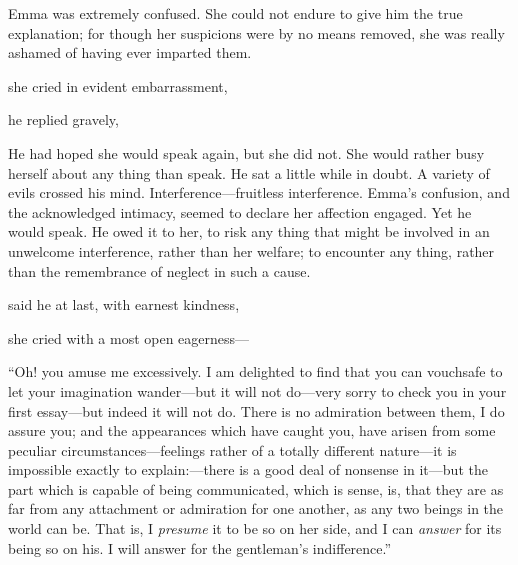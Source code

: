 Emma was extremely confused. She could not endure to give him the true explanation; for though her suspicions were by no means removed, she was really ashamed of having ever imparted them.

 she cried in evident embarrassment, 

 he replied gravely, 

He had hoped she would speak again, but she did not. She would rather busy herself about any thing than speak. He sat a little while in doubt. A variety of evils crossed his mind. Interference---fruitless interference. Emma's confusion, and the acknowledged intimacy, seemed to declare her affection engaged. Yet he would speak. He owed it to her, to risk any thing that might be involved in an unwelcome interference, rather than her welfare; to encounter any thing, rather than the remembrance of neglect in such a cause.

 said he at last, with earnest kindness, 



 she cried with a most open eagerness---


“Oh! you amuse me excessively. I am delighted to find that you can vouchsafe to let your imagination wander---but it will not do---very sorry to check you in your first essay---but indeed it will not do. There is no admiration between them, I do assure you; and the appearances which have caught you, have arisen from some peculiar circumstances---feelings rather of a totally different nature---it is impossible exactly to explain:---there is a good deal of nonsense in it---but the part which is capable of being communicated, which is sense, is, that they are as far from any attachment or admiration for one another, as any two beings in the world can be. That is, I {\em presume} it to be so on her side, and I can {\em answer} for its being so on his. I will answer for the gentleman's indifference.”

